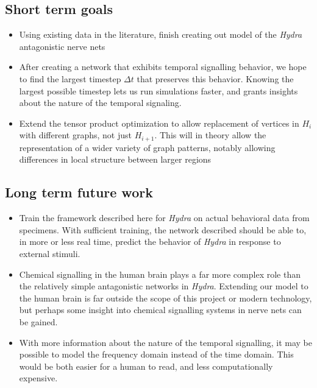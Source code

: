 \documentclass{article}
\begin{document}
\subsection{Short term goals}
\begin{itemize}
    \item Using existing data in the literature, finish creating out model of the \textit{Hydra} antagonistic nerve nets
    \item After creating a network that exhibits temporal signalling behavior, we hope to find the largest timestep $\Delta t$ that preserves this behavior. Knowing the largest possible timestep lets us run simulations faster, and grants insights about the nature of the temporal signaling.
    \item Extend the tensor product optimization to allow replacement of vertices in $H_i$ with different graphs, not just $H_{i+1}$. This will in theory allow the representation of a wider variety of graph patterns, notably allowing differences in local structure between larger regions
\end{itemize}


\subsection{Long term future work}
\begin{itemize}
    \item Train the framework described here for \textit{Hydra} on actual behavioral data from specimens. With sufficient training, the network described should be able to, in more or less real time, predict the behavior of \textit{Hydra} in response to external stimuli.
    \item Chemical signalling in the human brain plays a far more complex role than the relatively simple antagonistic networks in \textit{Hydra}. Extending our model to the human brain is far outside the scope of this project or modern technology, but perhaps some insight into chemical signalling systems in nerve nets can be gained.
    \item With more information about the nature of the temporal signalling, it may be possible to model the frequency domain instead of the time domain. This would be both easier for a human to read, and less computationally expensive.
\end{itemize}
\end{document}
